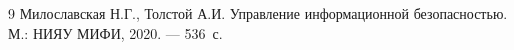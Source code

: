 \begin{thebibliography}{9}
 Милославская Н.Г., Толстой А.И.
Управление информационной безопасностью. М.: НИЯУ МИФИ, 2020. --- 536~с.
\end{thebibliography}
